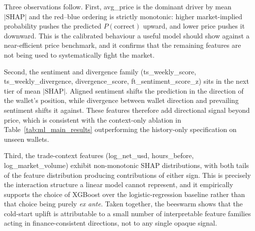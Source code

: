 \documentclass[11pt,a4paper]{article}
\begin{document}
Three observations follow. First, avg\_price is the dominant
driver by mean $|\text{SHAP}|$ and the red--blue ordering is strictly
monotonic: higher market-implied probability pushes the predicted
\(P(\text{correct})\) upward, and lower price pushes it downward. This
is the calibrated behaviour a useful model should show against a
near-efficient price benchmark, and it confirms that the remaining
features are not being used to systematically fight the market.

Second, the sentiment and divergence family
(ts\_weekly\_score, ts\_weekly\_divergence,
 divergence\_score, ft\_sentiment\_score\_z) sits in
the next tier of mean $|\text{SHAP}|$. Aligned sentiment shifts the
prediction in the direction of the wallet's position, while divergence
between wallet direction and prevailing sentiment shifts it against.
These features therefore add directional signal beyond price, which is
consistent with the context-only ablation in Table~\ref{tab:ml_main_results}
outperforming the history-only specification on unseen wallets.

Third, the trade-context features (log\_net\_usd,
hours\_before, log\_market\_volume) exhibit
non-monotonic SHAP distributions, with both tails of the feature
distribution producing contributions of either sign. This is precisely
the interaction structure a linear model cannot represent, and it
empirically supports the choice of XGBoost over the logistic-regression
baseline rather than that choice being purely \emph{ex ante}. Taken
together, the beeswarm shows that the cold-start uplift is attributable
to a small number of interpretable feature families acting in
finance-consistent directions, not to any single opaque signal.
\end{document}
